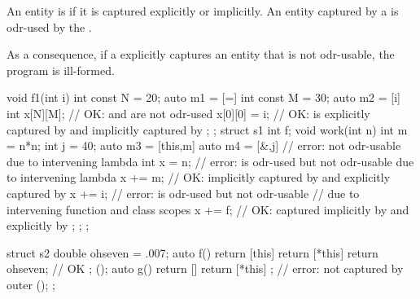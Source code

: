 \pnum
An entity is  if it is captured explicitly or implicitly. An entity
captured by a  is odr-used by
the .
\begin{note}
As a consequence, if a 
explicitly captures an entity that is not odr-usable,
the program is ill-formed.
\end{note}
\begin{example}
%
\begin{codeblock}
void f1(int i) {
  int const N = 20;
  auto m1 = [=]{
    int const M = 30;
    auto m2 = [i]{
      int x[N][M];          // OK:  and  are not odr-used
      x[0][0] = i;          // OK:  is explicitly captured by  and implicitly captured by 
    };
  };
  struct s1 {
    int f;
    void work(int n) {
      int m = n*n;
      int j = 40;
      auto m3 = [this,m] {
        auto m4 = [&,j] {       // error:  not odr-usable due to intervening lambda 
          int x = n;            // error:  is odr-used but not odr-usable due to intervening lambda 
          x += m;               // OK:  implicitly captured by  and explicitly captured by 
          x += i;               // error:  is odr-used but not odr-usable
                                // due to intervening function and class scopes
          x += f;               // OK:  captured implicitly by  and explicitly by 
        };
      };
    }
  };
}

struct s2 {
  double ohseven = .007;
  auto f() {
    return [this] {
      return [*this] {
          return ohseven;       // OK
      };
    }();
  }
  auto g() {
    return [] {
      return [*this] { };   // error:  not captured by outer 
    }();
  }
};
\end{codeblock}
\end{example}

